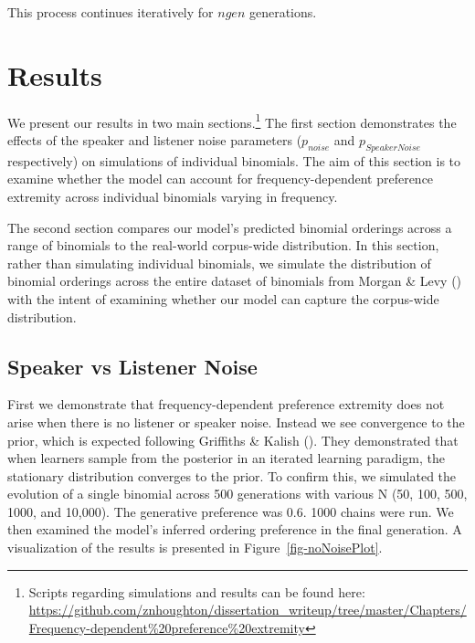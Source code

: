 \documentclass[
  12pt,
  letterpaper,
]{scrreprt}
\begin{document}
This process continues iteratively for \(ngen\) generations.

\section{Results}\label{results-10}

We present our results in two main sections.\footnote{Scripts regarding
  simulations and results can be found here:
  \url{https://github.com/znhoughton/dissertation_writeup/tree/master/Chapters/Frequency-dependent\%20preference\%20extremity}}
The first section demonstrates the effects of the speaker and listener
noise parameters (\(p_{noise}\) and \(p_{SpeakerNoise}\) respectively)
on simulations of individual binomials. The aim of this section is to
examine whether the model can account for frequency-dependent preference
extremity across individual binomials varying in frequency.

The second section compares our model's predicted binomial orderings
across a range of binomials to the real-world corpus-wide distribution.
In this section, rather than simulating individual binomials, we
simulate the distribution of binomial orderings across the entire
dataset of binomials from Morgan \& Levy
() with the intent of examining whether
our model can capture the corpus-wide distribution.

\subsection{Speaker vs Listener Noise}\label{speaker-vs-listener-noise}

First we demonstrate that frequency-dependent preference extremity does
not arise when there is no listener or speaker noise. Instead we see
convergence to the prior, which is expected following Griffiths \&
Kalish ().
They demonstrated that when learners sample from the posterior in an
iterated learning paradigm, the stationary distribution converges to the
prior. To confirm this, we simulated the evolution of a single binomial
across 500 generations with various N (50, 100, 500, 1000, and 10,000).
The generative preference was 0.6. 1000 chains were run. We then
examined the model's inferred ordering preference in the final
generation. A visualization of the results is presented in
Figure~\ref{fig-noNoisePlot}.
\end{document}
